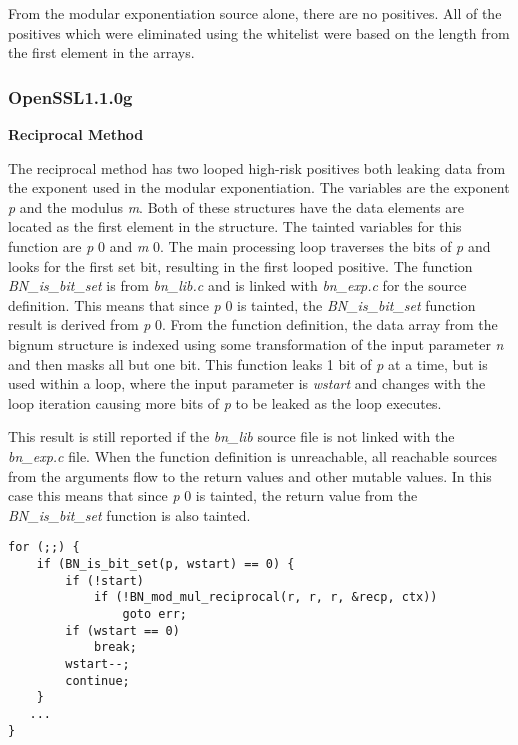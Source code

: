\documentclass[11pt,a4paper]{article}
\newcommand{\codevar}[1]{\textit{#1}}
\newcommand{\codefn}[1]{\textit{#1}}
\newcommand{\codefile}[1]{\textit{#1}}
\newcommand{\ruleabove}{}
\newcommand{\rulebelow}{}
\begin{document}
  From the modular exponentiation source alone, there are no positives. All of
  the positives which were eliminated using the whitelist were based on the
  length from the first element in the arrays.

\subsubsection{OpenSSL1.1.0g}

\noindent
\textbf{Reciprocal Method}

   The reciprocal method has two looped high-risk positives both leaking data
   from the exponent used in the modular exponentiation. The variables are the
   exponent \codevar{p} and the modulus \codevar{m}. Both of these structures have the data
   elements are located as the first element in the structure. The tainted
   variables for this function are \codevar{p} 0 and \codevar{m} 0. The main processing loop
   traverses the bits of \codevar{p} and looks for the first set bit, resulting in the
   first looped positive. The function \codefn{BN\_is\_bit\_set} is from  \codefile{bn\_lib.c} and is
   linked with \codefile{bn\_exp.c} for the source definition. This means that since \codevar{p} 0
   is tainted, the \codefn{BN\_is\_bit\_set} function result is derived from \codevar{p} 0. From
   the function definition, the data array from the bignum structure is indexed
   using some transformation of the input parameter \codevar{n} and then masks all but
   one bit. This function leaks 1 bit of \codevar{p} at a time, but is used within a
   loop, where the input parameter is \codevar{wstart} and changes with the loop
   iteration causing more bits of \codevar{p} to be leaked as the loop executes.
   
   This result is still reported if the \codefile{bn\_lib} source file is not linked with
   the \codefile{bn\_exp.c} file. When the function definition is unreachable, all reachable
   sources from the arguments flow to the return values and other mutable
   values. In this case this means that since \codevar{p} 0 is tainted, the return value
   from the \codefn{BN\_is\_bit\_set} function is also tainted.

\ruleabove
\begin{lstlisting}[caption=OpenSSL 1.1.0g - bn\_exp.c lines 250 - 259]
for (;;) {
    if (BN_is_bit_set(p, wstart) == 0) {
        if (!start)
            if (!BN_mod_mul_reciprocal(r, r, r, &recp, ctx))
                goto err;
        if (wstart == 0)
            break;
        wstart--;
        continue;
    }
   ...
}
\end{lstlisting}
\rulebelow
\end{document}
